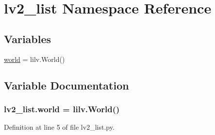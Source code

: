 \hypertarget{namespacelv2__list}{}\section{lv2\+\_\+list Namespace Reference}
\label{namespacelv2__list}
\subsection*{Variables}
\begin{DoxyCompactItemize}
\item 
\hyperlink{namespacelv2__list_a39bc711f56fd3393bf9013f08a1e5719}{world} = lilv.\+World()
\end{DoxyCompactItemize}


\subsection{Variable Documentation}
\subsubsection[{\texorpdfstring{world}{world}}]{\setlength{\rightskip}{0pt plus 5cm}lv2\+\_\+list.\+world = lilv.\+World()}\hypertarget{namespacelv2__list_a39bc711f56fd3393bf9013f08a1e5719}{}\label{namespacelv2__list_a39bc711f56fd3393bf9013f08a1e5719}


Definition at line 5 of file lv2\+\_\+list.\+py.

